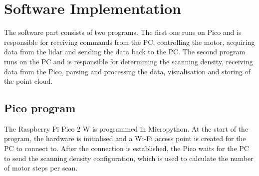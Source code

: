\section{Software Implementation}
The software part consists of two programs. The first one runs on Pico and is responsible for receiving commands from the PC, controlling the motor, acquiring data from the \gls{lidar} and sending the data back to the PC.
The second program runs on the PC and is responsible for determining the scanning density, receiving data from the Pico, parsing and processing the data, visualisation and storing of the point cloud.
\subsection{Pico program}
The Raspberry Pi Pico 2 W is programmed in Micropython. At the start of the program, the hardware is initialised and a Wi-Fi access point is created for the PC to connect to. 
After the connection is established, the Pico waits for the PC to send the scanning density configuration, which is used to calculate the number of motor steps per scan. 

